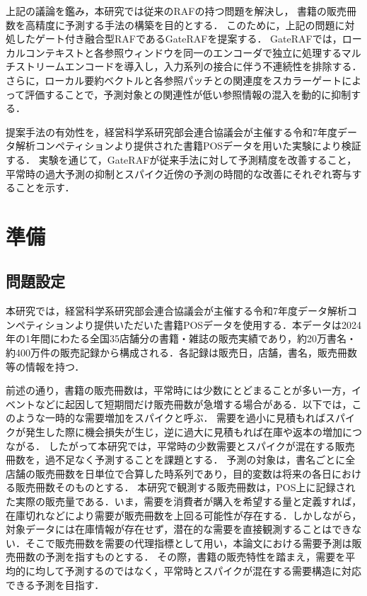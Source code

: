 \documentclass[twocolumn, lastpage]{jarticle}
\newif\ifrevmark
\newcommand{\revA}[1]{\ifrevmark{\color{blue}#1}\else#1\fi}
\begin{document}
上記の議論を鑑み，本研究では従来のRAFの持つ問題を解決し，
書籍の販売冊数を高精度に予測する手法の構築を目的とする．
このために，上記の問題に対処したゲート付き融合型RAFであるGateRAFを提案する．
GateRAFでは，ローカルコンテキストと各参照ウィンドウを同一のエンコーダで独立に処理するマルチストリームエンコードを導入し，入力系列の接合に伴う不連続性を排除する．さらに，ローカル要約ベクトルと各参照パッチとの関連度をスカラーゲートによって評価することで，予測対象との関連性が低い参照情報の混入を動的に抑制する．

提案手法の有効性を，経営科学系研究部会連合協議会が主催する令和7年度データ解析コンペティションより提供された書籍POSデータを用いた実験により検証する．
実験を通じて，GateRAFが従来手法に対して予測精度を改善すること，平常時の過大予測の抑制とスパイク近傍の予測の時間的な改善にそれぞれ寄与することを示す．



\section{準備}
\subsection{問題設定}
本研究では，経営科学系研究部会連合協議会が主催する令和7年度データ解析コンペティションより提供いただいた書籍POSデータを使用する．本データは2024年の1年間にわたる全国35店舗分の書籍・雑誌の販売実績であり，約20万書名・約400万件の販売記録から構成される．各記録は販売日，店舗，書名，販売冊数等の情報を持つ．

前述の通り，書籍の販売冊数は，平常時には少数にとどまることが多い一方，イベントなどに起因して短期間だけ販売冊数が急増する場合がある．以下では，このような一時的な需要増加をスパイクと呼ぶ．
需要を過小に見積もればスパイクが発生した際に機会損失が生じ，逆に過大に見積もれば在庫や返本の増加につながる．
したがって本研究では，平常時の少数需要とスパイクが混在する販売冊数を，過不足なく予測することを課題とする．
\revA{予測の対象は，書名ごとに全店舗の販売冊数を日単位で合算した時系列であり，目的変数は将来の各日における販売冊数そのものとする．}
\revA{本研究で観測する販売冊数は，POS上に記録された実際の販売量である．いま，需要を消費者が購入を希望する量と定義すれば，在庫切れなどにより需要が販売冊数を上回る可能性が存在する．しかしながら，対象データには在庫情報が存在せず，潜在的な需要を直接観測することはできない．そこで販売冊数を需要の代理指標として用い，本論文における需要予測は販売冊数の予測を指すものとする．}
その際，書籍の販売特性を踏まえ，需要を平均的に均して予測するのではなく，平常時とスパイクが混在する需要構造に対応できる予測を目指す．
\end{document}
